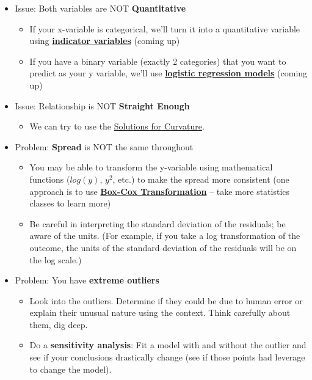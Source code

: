 \documentclass[
]{book}
\providecommand{\tightlist}{%
  \setlength{\itemsep}{0pt}\setlength{\parskip}{0pt}}
\begin{document}
\begin{itemize}
\tightlist
\item
  Issue: Both variables are NOT \textbf{Quantitative}

  \begin{itemize}
  \tightlist
  \item
    If your x-variable is categorical, we'll turn it into a quantitative variable using \hyperref[indicator-variables]{\textbf{indicator variables}} (coming up)
  \item
    If you have a binary variable (exactly 2 categories) that you want to predict as your y variable, we'll use \hyperref[logistic]{\textbf{logistic regression models}} (coming up)
  \end{itemize}
\item
  Issue: Relationship is NOT \textbf{Straight Enough}

  \begin{itemize}
  \tightlist
  \item
    We can try to use the \hyperref[solutions-for-curvature]{Solutions for Curvature}.
  \end{itemize}
\item
  Problem: \textbf{Spread} is NOT the same throughout

  \begin{itemize}
  \tightlist
  \item
    You may be able to transform the y-variable using mathematical functions (\(log(y)\), \(y^2\), etc.) to make the spread more consistent (one approach is to use \href{https://en.wikipedia.org/wiki/Power_transform\#Box\%E2\%80\%93Cox_transformation}{\textbf{Box-Cox Transformation}} -- take more statistics classes to learn more)
  \item
    Be careful in interpreting the standard deviation of the residuals; be aware of the units. (For example, if you take a log transformation of the outcome, the units of the standard deviation of the residuals will be on the log scale.)
  \end{itemize}
\item
  Problem: You have \textbf{extreme outliers}

  \begin{itemize}
  \tightlist
  \item
    Look into the outliers. Determine if they could be due to human error or explain their unusual nature using the context. Think carefully about them, dig deep.
  \item
    Do a \textbf{sensitivity analysis}: Fit a model with and without the outlier and see if your conclusions drastically change (see if those points had leverage to change the model).
  \end{itemize}
\end{itemize}
\end{document}
